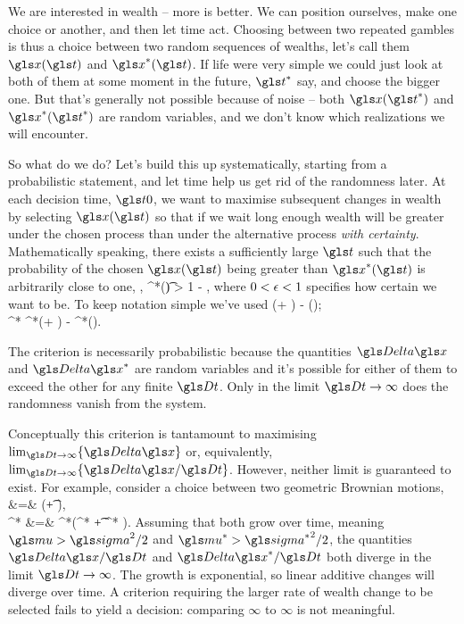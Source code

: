We are interested in wealth -- more is better. We can position ourselves, make one choice or 
another, and then let time act. Choosing between two repeated gambles is thus a choice between 
two random sequences of wealths, let's call them $\x(\t)$ and $\x^*(\t)$. If life were very simple we could 
just look at both of them at some moment in the future, $\t^*$ say, and choose the bigger one. But 
that's generally not possible because of noise -- both  $\x(\t^*)$ and $\x^*(\t^*)$ are random 
variables, and we don't know which realizations we will encounter. 

So what do we do? Let's build this up systematically, starting from a probabilistic statement, and let time help us get rid of the randomness later. 
At each decision time, $\tn$, we want to maximise 
subsequent changes in wealth by selecting $\x(\t)$ so that
if we wait long enough wealth will be greater
under the chosen process than under the alternative process
{\it with certainty}. Mathematically speaking, there exists a sufficiently 
large $\t$ such that the probability of the chosen $\x(\t)$ being greater
than $\x^*(\t)$ is arbitrarily close to one,
\be
\forall \eps, \x^{*}(\t) \quad \exists \Dt \quad {} \quad \prob{\D\x > \D\x^*} > 1 - \epsilon,
\ee
where $0<\epsilon<1$ specifies how certain we want to be. To keep notation simple we've used
\bea
\D\x \equiv \x(\tn + \Dt) - \x(\tn);\\
\D\x^* \equiv \x^*(\tn + \Dt) - \x^*(\tn).
\eea


The criterion is necessarily probabilistic because the quantities $\D\x$ and 
$\D\x^*$ are random variables and it's possible for either of them to exceed 
the other for any finite $\Dt$. Only in the limit $\Dt \to \infty$ does
the randomness vanish from the system.

Conceptually this criterion is tantamount to maximising 
$\lim_{\Dt\to\infty}\{\D\x\}$ or, equivalently, $\lim_{\Dt\to\infty}\{\D\x/\Dt\}$. 
However, neither limit is guaranteed to exist. For example, consider a 
choice between two geometric Brownian motions,
\bea
\gd\x &=& \x(\gmu \gd\t + \gsigma \gd\gW),\\
\gd\x^* &=& \x^*(\gmu^* \gd\t + \gsigma^* \gd\gW).
\eea
Assuming that both grow over time, meaning $\gmu > \gsigma^2/2$ and $\gmu^* > {\gsigma^*}^2/2$, the quantities $\D\x/\Dt$ and $\D\x^*/\Dt$ both diverge in the limit $\Dt\to\infty$. The growth is exponential, so linear additive changes will diverge over time. A 
criterion requiring the larger rate of wealth change to be selected fails to yield a decision: comparing $\infty$ to $\infty$ is not meaningful.

